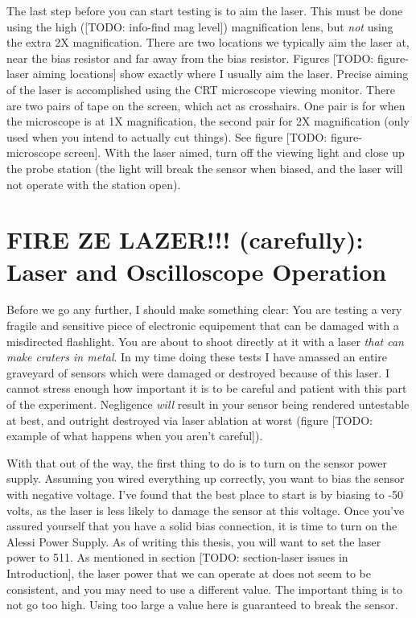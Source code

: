 \documentclass{report}
\begin{document}
            The last step before you can start testing is to aim the laser. This must be done using the high ([TODO: info-find mag level]) magnification lens, but \textit{not} using the extra 2X magnification. There are two locations we typically aim the laser at, near the bias resistor and far away from the bias resistor. Figures [TODO: figure-laser aiming locations] show exactly where I usually aim the laser. Precise aiming of the laser is accomplished using the CRT microscope viewing monitor. There are two pairs of tape on the screen, which act as crosshairs. One pair is for when the microscope is at 1X magnification, the second pair for 2X magnification (only used when you intend to actually cut things). See figure [TODO: figure-microscope screen]. With the laser aimed, turn off the viewing light and close up the probe station (the light will break the sensor when biased, and the laser will not operate with the station open).

        \section{ FIRE ZE LAZER!!! (carefully): \\ Laser and Oscilloscope Operation }
            Before we go any further, I should make something clear: You are testing a very fragile and sensitive piece of electronic equipement that can be damaged with a misdirected flashlight. You are about to shoot directly at it with a laser \textit{that can make craters in metal}. In my time doing these tests I have amassed an entire graveyard of sensors which were damaged or destroyed because of this laser. I cannot stress enough how important it is to be careful and patient with this part of the experiment. Negligence \textit{will} result in your sensor being rendered untestable at best, and outright destroyed via laser ablation at worst (figure [TODO: example of what happens when you aren't careful]).

            With that out of the way, the first thing to do is to turn on the sensor power supply. Assuming you wired everything up correctly, you want to bias the sensor with negative voltage. I've found that the best place to start is by biasing to -50 volts, as the laser is less likely to damage the sensor at this voltage. Once you've assured yourself that you have a solid bias connection, it is time to turn on the Alessi Power Supply. As of writing this thesis, you will want to set the laser power to 511. As mentioned in section [TODO: section-laser issues in Introduction], the laser power that we can operate at does not seem to be consistent, and you may need to use a different value. The important thing is to not go too high. Using too large a value here is guaranteed to break the sensor.
\end{document}
